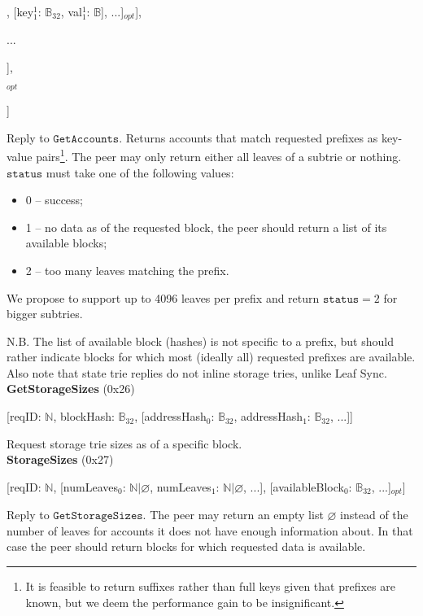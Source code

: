 \documentclass{amsart}
\begin{document}
\qquad [status$_1$: $\mathbb{N}$, [[key$^0_{1}$: $\mathbb{B}_{32}$, val$^0_{1}$: $\mathbb{B}$], [key$^1_{1}$: $\mathbb{B}_{32}$, val$^1_{1}$: $\mathbb{B}$], ...]$_{opt}$],

\qquad ...

\quad ],

$_{opt}$

]
\medskip

Reply to $\texttt{GetAccounts}$.
Returns accounts that match requested prefixes as key-value pairs\footnote{It
is feasible to return suffixes rather than full keys given that prefixes are known,
but we deem the performance gain to be insignificant.}.
The peer may only return either all leaves of a subtrie or nothing.
$\texttt{status}$ must take one of the following values:
\begin{itemize}
\item 0 -- success;
\item 1 -- no data as of the requested block, the peer should return a list of its available blocks;
\item 2 -- too many leaves matching the prefix.
\end{itemize}
We propose to support up to 4096 leaves per prefix
and return $\texttt{status} = 2$ for bigger subtries.

N.B. The list of available block (hashes) is not specific to a prefix,
but should rather indicate blocks for which most (ideally all) requested prefixes are available.
Also note that state trie replies do not inline storage tries, unlike Leaf Sync.\\

\textbf{GetStorageSizes} (0x26)

[reqID: $\mathbb{N}$, blockHash: $\mathbb{B}_{32}$,
[addressHash$_0$: $\mathbb{B}_{32}$, addressHash$_1$: $\mathbb{B}_{32}$, ...]]
\medskip

Request storage trie sizes as of a specific block.\\

\textbf{StorageSizes} (0x27)

[reqID: $\mathbb{N}$,
[numLeaves$_0$: $\mathbb{N} | \varnothing$, numLeaves$_1$: $\mathbb{N} | \varnothing$, ...],
[availableBlock$_0$: $\mathbb{B}_{32}$, ...]$_{opt}$]
\medskip

Reply to $\texttt{GetStorageSizes}$.
The peer may return an empty list $\varnothing$ instead of the number of leaves for accounts it does not have enough information about.
In that case the peer should return blocks for which requested data is available.\\
\end{document}
